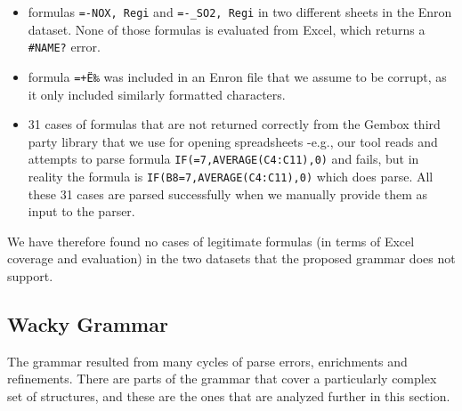 \documentclass[conference]{IEEEtran}
\begin{document}
\begin{itemize}
	\item formulas \texttt{=-NOX, Regi} and \texttt{=-_SO2, Regi} in two different sheets in the Enron dataset. None of those formulas is evaluated from Excel, which returns a \texttt{\#NAME?} error.
	\item formula \texttt{=+Ë‰} was included in an Enron file that we assume to be corrupt, as it only included similarly formatted characters.
	\item 31 cases of formulas that are not returned correctly from the Gembox third party library that we use for opening spreadsheets -e.g., our tool reads and attempts to parse formula \texttt{IF(=7,AVERAGE(C4:C11),0)} and fails, but in reality the formula is \texttt{IF(B8=7,AVERAGE(C4:C11),0)} which does parse. All these 31 cases are parsed successfully when we manually provide them as input to the parser.
\end{itemize}

We have therefore found no cases of legitimate formulas (in terms of Excel coverage and evaluation) in the two datasets that the proposed grammar does not support.

\subsection{Wacky Grammar}
The grammar resulted from many cycles of parse errors, enrichments and refinements. There are parts of the grammar that cover a particularly complex set of structures, and these are the ones that are analyzed further in this section.
\end{document}
